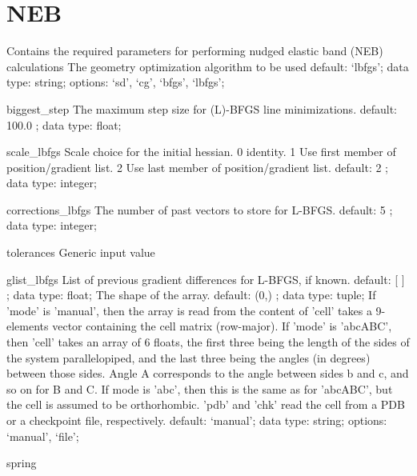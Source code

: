 \section{NEB}
\label{NEB}
\begin{ipifield}{}%
{Contains the required parameters for performing nudged elastic band (NEB) calculations}%
{}%
{%
{The geometry optimization algorithm to be used}%
{default: `lbfgs'; data type: string; options: `sd', `cg', `bfgs', `lbfgs'; }%
}
\begin{ipifield}{biggest\_step}%
{The maximum step size for (L)-BFGS line minimizations.}%
{default:  100.0 ; data type: float; }%
{}
\end{ipifield}
\begin{ipifield}{scale\_lbfgs}%
{Scale choice for the initial hessian.
                                            0 identity.
                                            1 Use first member of position/gradient list.
                                            2 Use last  member of position/gradient list.}%
{default:  2 ; data type: integer; }%
{}
\end{ipifield}
\begin{ipifield}{corrections\_lbfgs}%
{The number of past vectors to store for L-BFGS.}%
{default:  5 ; data type: integer; }%
{}
\end{ipifield}
\begin{ipifield}{tolerances}%
{Generic input value}%
{}%
{}
\end{ipifield}
\begin{ipifield}{glist\_lbfgs}%
{List of previous gradient differences for L-BFGS, if known.}%
{default:  [ ] ; data type: float; }%
{%
{The shape of the array.}%
{default:  (0,) ; data type: tuple; }%
%
{If 'mode' is 'manual', then the array is read from the content of 'cell' takes a 9-elements vector containing the cell matrix (row-major). If 'mode' is 'abcABC', then 'cell' takes an array of 6 floats, the first three being the length of the sides of the system parallelopiped, and the last three being the angles (in degrees) between those sides. Angle A corresponds to the angle between sides b and c, and so on for B and C. If mode is 'abc', then this is the same as for 'abcABC', but the cell is assumed to be orthorhombic. 'pdb' and 'chk' read the cell from a PDB or a checkpoint file, respectively.}%
{default: `manual'; data type: string; options: `manual', `file'; }%
}
\end{ipifield}
\begin{ipifield}{spring}%

\end{ipifield}
\end{ipifield}
